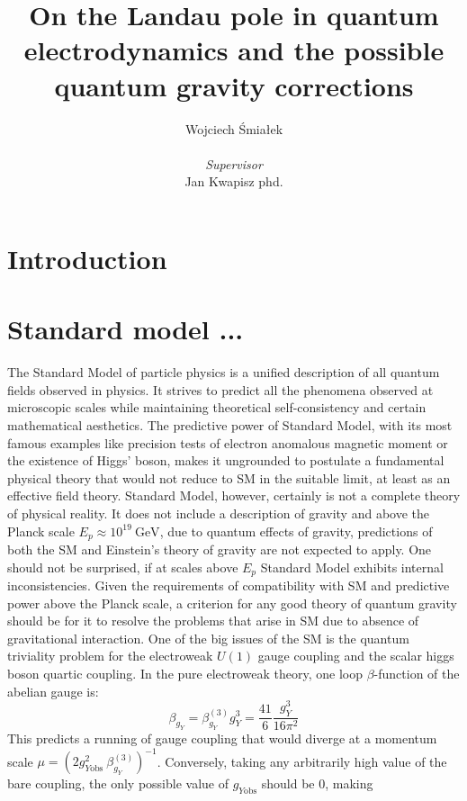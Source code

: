 \documentclass[11pt, a4paper]{article}
\title{\vspace{-2cm}On the Landau pole in quantum electrodynamics and the possible quantum gravity corrections}
\author{{Wojciech Śmiałek}\\
\\
{\textit{Supervisor}} \\
{Jan Kwapisz phd.}}
\date{}
\begin{document}
\maketitle

\section*{Introduction}

\section{Standard model ...}
The Standard Model of particle physics is a unified description of all quantum fields observed in physics. 
It strives to predict all the phenomena observed at microscopic scales while maintaining theoretical
self-consistency and certain mathematical aesthetics. The predictive power of Standard Model, with its most
famous examples like precision tests of electron anomalous magnetic moment or the existence of Higgs' boson,
makes it ungrounded to postulate a fundamental physical theory that would not reduce to SM in the suitable limit, at least
as an effective field theory.
Standard Model, however, certainly is not a complete theory of physical reality. It does not include a description
of gravity and above the Planck scale $E_p \approx 10^{19} \ \text{GeV}$, due to quantum effects of gravity,
predictions of both the SM and Einstein's theory of gravity are not expected to apply.
One should not be surprised, if at scales above $E_p$ Standard Model exhibits internal inconsistencies.
Given the requirements of compatibility with SM and predictive power above the Planck scale, a criterion
for any good theory of quantum gravity should be for it to resolve the problems that arise in SM due to absence of
gravitational interaction.
One of the big issues of the SM is the quantum triviality problem for the electroweak $U(1)$ gauge coupling and
the scalar higgs boson quartic coupling.
In the pure electroweak theory, one loop $\beta$-function of the abelian gauge \cite{betaf scalar} \cite{betaf chiral lagrangian} is:%
\begin{equation}
    \beta_{g_Y} = \beta_{g_Y}^{(3)} g_Y^3 = \frac{41}{6} \frac{g_Y^3}{16 \pi^2}
\end{equation}
This predicts a running of gauge coupling that would diverge at a momentum scale $\mu = \left(2 g_{Y\text{obs}}^2 \ \beta_{g_Y}^{(3)} \right)^{-1} $.
Conversely, taking any arbitrarily high value of the bare coupling, the only possible value of $g_{Y\text{obs}}$ should be 0, making
\end{document}
